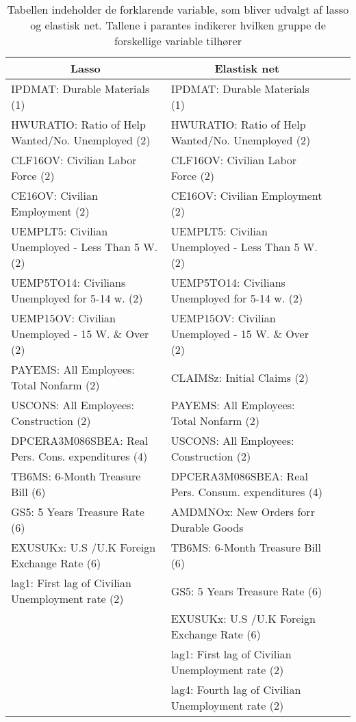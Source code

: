  \begin{table}
\small
\center
\begin{tabular}{lllc}
\toprule
\multicolumn{1}{c}{Lasso} & \multicolumn{1}{c}{Elastisk net} \\ \midrule
IPDMAT: Durable Materials (1)   & IPDMAT: Durable Materials (1)    \\
HWURATIO: Ratio of Help Wanted/No. Unemployed (2) &  HWURATIO: Ratio of Help Wanted/No. Unemployed (2) \\
CLF16OV: Civilian Labor Force (2) & CLF16OV:  Civilian Labor Force (2)  \\
CE16OV: Civilian Employment  (2) & CE16OV:  Civilian Employment  (2)  \\
UEMPLT5: Civilian Unemployed - Less Than 5 W.(2) & UEMPLT5:  Civilian Unemployed - Less Than 5 W. (2)  \\
UEMP5TO14: Civilians Unemployed for 5-14 w. (2) & UEMP5TO14: Civilians Unemployed for 5-14 w. (2)    \\
UEMP15OV: Civilian Unemployed - 15 W. \& Over (2) & UEMP15OV:  Civilian Unemployed - 15 W. \& Over (2)  \\
PAYEMS: All Employees: Total Nonfarm (2) & CLAIMSz:  Initial Claims (2)  \\
USCONS: All Employees: Construction (2) & PAYEMS: All Employees: Total Nonfarm (2) \\
DPCERA3M086SBEA: Real Pers. Cons. expenditures (4) &  USCONS:  All Employees: Construction (2) \\
TB6MS: 6-Month Treasure Bill (6) & DPCERA3M086SBEA: Real Pers. Consum. expenditures (4)  \\
GS5: 5 Years Treasure Rate (6) & AMDMNOx: New Orders forr Durable Goods  \\
EXUSUKx: U.S /U.K Foreign Exchange Rate  (6) & TB6MS:  6-Month Treasure Bill (6)   \\
lag1: First lag of Civilian Unemployment rate (2) & GS5:  5 Years Treasure Rate (6)\\
& EXUSUKx: U.S /U.K Foreign Exchange Rate  (6)  \\ 
&  lag1: First lag of Civilian Unemployment rate (2) \\
&  lag4: Fourth lag of Civilian Unemployment rate (2)  \\\bottomrule 
\end{tabular}
\caption{Tabellen indeholder de forklarende variable, som bliver udvalgt af lasso og elastisk net. Tallene i parantes indikerer hvilken gruppe de forskellige variable tilhører} \label{tab: lasso_ud}
\end{table}
